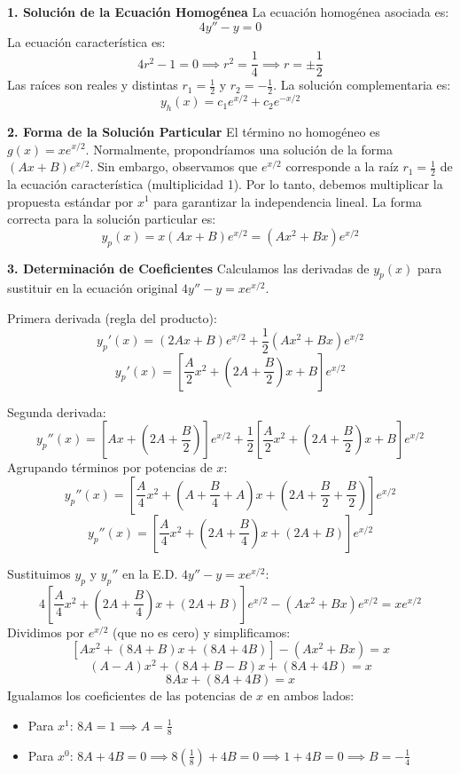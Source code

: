\documentclass[a4paper]{article}
\begin{document}
\textbf{1. Solución de la Ecuación Homogénea}
La ecuación homogénea asociada es:
$$
4y'' - y = 0
$$
La ecuación característica es:
$$
4r^2 - 1 = 0 \implies r^2 = \frac{1}{4} \implies r = \pm \frac{1}{2}
$$
Las raíces son reales y distintas $r_1 = \frac{1}{2}$ y $r_2 = -\frac{1}{2}$. La solución complementaria es:
$$
y_h(x) = c_1 e^{x/2} + c_2 e^{-x/2}
$$

\textbf{2. Forma de la Solución Particular}
El término no homogéneo es $g(x) = x e^{x/2}$. Normalmente, propondríamos una solución de la forma $(Ax + B)e^{x/2}$. Sin embargo, observamos que $e^{x/2}$ corresponde a la raíz $r_1 = \frac{1}{2}$ de la ecuación característica (multiplicidad 1). Por lo tanto, debemos multiplicar la propuesta estándar por $x^1$ para garantizar la independencia lineal.
La forma correcta para la solución particular es:
$$
y_p(x) = x(Ax + B)e^{x/2} = (Ax^2 + Bx)e^{x/2}
$$

\textbf{3. Determinación de Coeficientes}
Calculamos las derivadas de $y_p(x)$ para sustituir en la ecuación original $4y'' - y = x e^{x/2}$.

Primera derivada (regla del producto):
$$
y_p'(x) = (2Ax + B)e^{x/2} + \frac{1}{2}(Ax^2 + Bx)e^{x/2}
$$
$$
y_p'(x) = \left[ \frac{A}{2}x^2 + \left( 2A + \frac{B}{2} \right)x + B \right] e^{x/2}
$$

Segunda derivada:
$$
y_p''(x) = \left[ Ax + \left( 2A + \frac{B}{2} \right) \right] e^{x/2} + \frac{1}{2} \left[ \frac{A}{2}x^2 + \left( 2A + \frac{B}{2} \right)x + B \right] e^{x/2}
$$
Agrupando términos por potencias de $x$:
$$
y_p''(x) = \left[ \frac{A}{4}x^2 + \left( A + \frac{B}{4} + A \right)x + \left( 2A + \frac{B}{2} + \frac{B}{2} \right) \right] e^{x/2}
$$
$$
y_p''(x) = \left[ \frac{A}{4}x^2 + \left( 2A + \frac{B}{4} \right)x + (2A + B) \right] e^{x/2}
$$

Sustituimos $y_p$ y $y_p''$ en la E.D. $4y'' - y = x e^{x/2}$:
$$
4 \left[ \frac{A}{4}x^2 + \left( 2A + \frac{B}{4} \right)x + (2A + B) \right] e^{x/2} - (Ax^2 + Bx)e^{x/2} = x e^{x/2}
$$
Dividimos por $e^{x/2}$ (que no es cero) y simplificamos:
$$
\left[ Ax^2 + (8A + B)x + (8A + 4B) \right] - (Ax^2 + Bx) = x
$$
$$
(A - A)x^2 + (8A + B - B)x + (8A + 4B) = x
$$
$$
8A x + (8A + 4B) = x
$$
Igualamos los coeficientes de las potencias de $x$ en ambos lados:
\begin{itemize}
    \item Para $x^1$: $8A = 1 \implies A = \frac{1}{8}$
    \item Para $x^0$: $8A + 4B = 0 \implies 8(\frac{1}{8}) + 4B = 0 \implies 1 + 4B = 0 \implies B = -\frac{1}{4}$
\end{itemize}
\end{document}

